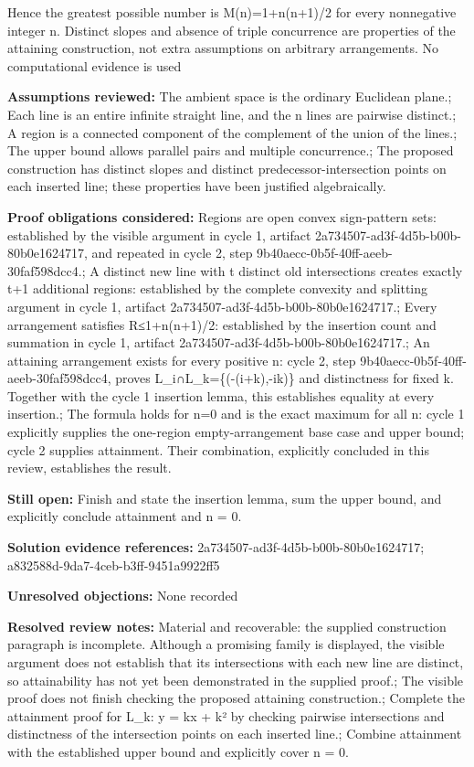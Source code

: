 \documentclass[11pt]{article}
\begin{document}
Hence the greatest possible number is M(n)=1+n(n+1)/2 for every nonnegative integer n. Distinct slopes and absence of triple concurrence are properties of the attaining construction, not extra assumptions on arbitrary arrangements. No computational evidence is used\par
\textbf{Assumptions reviewed:} The ambient space is the ordinary Euclidean plane.; Each line is an entire infinite straight line, and the n lines are pairwise distinct.; A region is a connected component of the complement of the union of the lines.; The upper bound allows parallel pairs and multiple concurrence.; The proposed construction has distinct slopes and distinct predecessor-intersection points on each inserted line; these properties have been justified algebraically.\par
\textbf{Proof obligations considered:} Regions are open convex sign-pattern sets: established by the visible argument in cycle 1, artifact 2a734507-ad3f-4d5b-b00b-80b0e1624717, and repeated in cycle 2, step 9b40aecc-0b5f-40ff-aeeb-30faf598dcc4.; A distinct new line with t distinct old intersections creates exactly t+1 additional regions: established by the complete convexity and splitting argument in cycle 1, artifact 2a734507-ad3f-4d5b-b00b-80b0e1624717.; Every arrangement satisfies R≤1+n(n+1)/2: established by the insertion count and summation in cycle 1, artifact 2a734507-ad3f-4d5b-b00b-80b0e1624717.; An attaining arrangement exists for every positive n: cycle 2, step 9b40aecc-0b5f-40ff-aeeb-30faf598dcc4, proves L\_i∩L\_k=\{(-(i+k),-ik)\} and distinctness for fixed k. Together with the cycle 1 insertion lemma, this establishes equality at every insertion.; The formula holds for n=0 and is the exact maximum for all n: cycle 1 explicitly supplies the one-region empty-arrangement base case and upper bound; cycle 2 supplies attainment. Their combination, explicitly concluded in this review, establishes the result.\par
\textbf{Still open:} Finish and state the insertion lemma, sum the upper bound, and explicitly conclude attainment and n = 0.\par
\textbf{Solution evidence references:} 2a734507-ad3f-4d5b-b00b-80b0e1624717; a832588d-9da7-4ceb-b3ff-9451a9922ff5\par
\textbf{Unresolved objections:} None recorded\par
\textbf{Resolved review notes:} Material and recoverable: the supplied construction paragraph is incomplete. Although a promising family is displayed, the visible argument does not establish that its intersections with each new line are distinct, so attainability has not yet been demonstrated in the supplied proof.; The visible proof does not finish checking the proposed attaining construction.; Complete the attainment proof for L\_k: y = kx + k² by checking pairwise intersections and distinctness of the intersection points on each inserted line.; Combine attainment with the established upper bound and explicitly cover n = 0.\par
\end{document}
